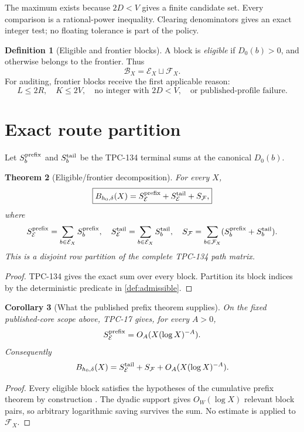 \documentclass[11pt]{article}
\newtheorem{theorem}{Theorem}[section]
\newtheorem{corollary}[theorem]{Corollary}
\theoremstyle{definition}
\newtheorem{definition}[theorem]{Definition}
\theoremstyle{remark}
\newcommand{\E}{\mathcal E}
\newcommand{\F}{\mathcal F}
\newcommand{\B}{\mathcal B}
\begin{document}
The maximum exists because \(2D<V\) gives a finite candidate set.
Every comparison is a rational-power inequality.  Clearing
denominators gives an exact integer test; no floating tolerance is
part of the policy.

\begin{definition}[Eligible and frontier blocks]
A block is \emph{eligible} if \(D_0(b)>0\), and otherwise belongs to
the frontier.  Thus
\[
 \B_X=\E_X\sqcup\F_X.
\]
For auditing, frontier blocks receive the first applicable reason:
\[
 L\le2R,\quad K\le2V,\quad\text{no integer with }2D<V,
 \quad\text{or published-profile failure}.
\]
\end{definition}

\section{Exact route partition}

Let \(S_b^{\rm prefix}\) and \(S_b^{\rm tail}\) be the TPC-134
terminal sums at the canonical \(D_0(b)\).

\begin{theorem}[Eligible/frontier decomposition]
\label{thm:partition}
For every \(X\),
\[
 \boxed{
 B_{h_0,\delta}(X)
 =
 S_{\E}^{\rm prefix}
 +S_{\E}^{\rm tail}
 +S_{\F},}
\]
where
\[
 S_{\E}^{\rm prefix}=\sum_{b\in\E_X}S_b^{\rm prefix},
 \quad
 S_{\E}^{\rm tail}=\sum_{b\in\E_X}S_b^{\rm tail},
 \quad
 S_{\F}=\sum_{b\in\F_X}
 (S_b^{\rm prefix}+S_b^{\rm tail}).
\]
This is a disjoint row partition of the complete TPC-134 path matrix.
\end{theorem}

\begin{proof}
TPC-134 gives the exact sum over every block.  Partition its block
indices by the deterministic predicate in \cref{def:admissible}.
\end{proof}

\begin{corollary}[What the published prefix theorem supplies]
\label{cor:prefix}
On the fixed published-core scope above, TPC-17 gives, for every
\(A>0\),
\[
 S_{\E}^{\rm prefix}
 =O_A(X(\log X)^{-A}).
\]
Consequently
\[
 B_{h_0,\delta}(X)
 =
 S_{\E}^{\rm tail}+S_{\F}
 +O_A(X(\log X)^{-A}).
\]
\end{corollary}

\begin{proof}
Every eligible block satisfies the hypotheses of the cumulative
prefix theorem by construction \citep{WangTPC17}.  The dyadic support
gives \(O_W(\log X)\) relevant block pairs, so arbitrary logarithmic
saving survives the sum.  No estimate is applied to \(\F_X\).
\end{proof}
\end{document}
